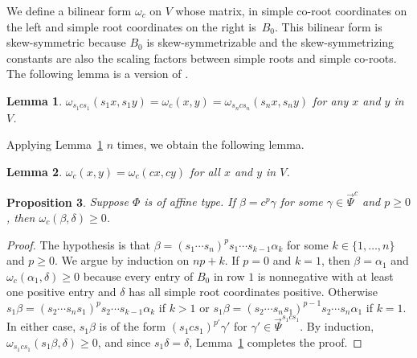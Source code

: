 \documentclass{amsart}
\newtheorem{proposition}{Proposition}[section]
\newtheorem{lemma}[proposition]{Lemma}
\theoremstyle{definition}
\theoremstyle{remark}
\numberwithin{equation}{section}
\newcommand{\set}[1]{{\lbrace #1 \rbrace}}
\newcommand{\0}{{\mathbf{0}}}
\newcommand{\RSChar}{\Phi}
\newcommand{\RS}{\RSChar}
\newcommand{\TravInfChar}{\Psi}
\newcommand{\TravProj}[1]{\overrightarrow{\TravInfChar}^{#1}}
\begin{document}
We define a bilinear form $\omega_c$ on $V$ whose matrix, in simple co-root coordinates on the left and simple root coordinates on the right is~$B_0$.
This bilinear form is skew-symmetric because $B_0$ is skew-symmetrizable and the skew-symmetrizing constants are also the scaling factors between simple roots and simple co-roots.
The following lemma is a version of \cite[Lemma~3.8]{typefree}.

\begin{lemma}\label{omega s}
$\omega_{s_1cs_1}(s_1x,s_1y)=\omega_c(x,y)=\omega_{s_ncs_n}(s_nx,s_ny)$ for any $x$ and $y$ in~$V$.
\end{lemma}

Applying Lemma~\ref{omega s} $n$ times, we obtain the following lemma.

\begin{lemma}\label{omega c}
$\omega_c(x,y)=\omega_c(cx,cy)$ for all $x$ and $y$ in $V$.
\end{lemma}

\begin{proposition}\label{om del}
Suppose $\RS$ is of affine type.
If $\beta=c^p\gamma$ for some $\gamma\in\TravProj{c}$ and $p\ge0$, then $\omega_c(\beta,\delta)\ge0$. 
\end{proposition}
\begin{proof}
The hypothesis is that $\beta=(s_1\cdots s_n)^ps_1\cdots s_{k-1}\alpha_k$ for some $k\in\set{1,\ldots,n}$ and $p\ge0$.
We argue by induction on $np+k$.
If $p=0$ and $k=1$, then $\beta=\alpha_1$ and $\omega_c(\alpha_1,\delta)\ge0$ because every entry of $B_0$ in row $1$ is nonnegative with at least one positive entry and $\delta$ has all simple root coordinates positive.
Otherwise $s_1\beta=(s_2\cdots s_ns_1)^ps_2\cdots s_{k-1}\alpha_k$ if $k>1$ or $s_1\beta=(s_2\cdots s_ns_1)^{p-1}s_2\cdots s_n\alpha_1$ if $k=1$.
In either case, $s_1\beta$ is of the form $(s_1cs_1)^{p'}\gamma'$ for $\gamma'\in\TravProj{s_1cs_1}$.
By induction, $\omega_{s_1cs_1}(s_1\beta,\delta)\ge0$, and since $s_1\delta=\delta$, Lemma~\ref{omega s} completes the proof.
\end{proof}

\end{document}
